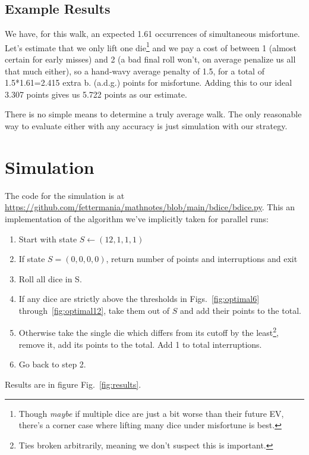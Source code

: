 \documentclass[11pt, oneside]{article} 	%
\begin{document}
\subsection{Example Results}

We have, for this walk, an expected 1.61 occurrences of simultaneous misfortune. Let's estimate that we only lift one die\footnote{Though \emph{maybe} if multiple dice are just a bit worse than their future EV, there's a corner case where lifting many dice under misfortune is best.} and we pay a cost of between 1 (almost certain for early misses) and 2 (a bad final roll won't, on average penalize us all that much either), so a hand-wavy average penalty of 1.5, for a total of 1.5*1.61=2.415 extra b. (a.d.g.) points for misfortune. Adding this to our ideal 3.307 points gives us 5.722 points as our estimate.

There is no simple means to determine a truly average walk.  The only reasonable way to evaluate either with any accuracy is just simulation with our strategy. 

\section{Simulation} \label {section:simulation}

The code for the simulation is at \url{https://github.com/fettermania/mathnotes/blob/main/bdice/bdice.py}. This an implementation of the algorithm we've implicitly taken for parallel runs:
\begin{enumerate}
\item Start with state $S \leftarrow (12,1,1,1)$
\item If state $S = (0, 0, 0, 0)$, return number of points and interruptions and exit
\item Roll all dice in S.
\item If any dice are strictly above the thresholds in Figs.~\ref{fig:optimal6} through~\ref{fig:optimal12}, take them out of $S$ and add their points to the total.
\item Otherwise take the single die which differs from its cutoff by the least\footnote{Ties broken arbitrarily, meaning we don't suspect this is important.}, remove it, add its points to the total. Add 1 to total interruptions.
\item Go back to step 2.
\end{enumerate}

Results are in figure Fig.~\ref{fig:results}.
\end{document}
